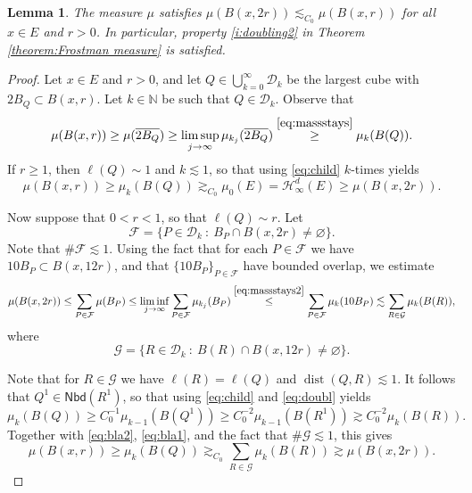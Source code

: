 \documentclass[11pt,reqno]{amsart}
\def\dF{{\mathcal{F}}}
\def\dG{{\mathcal{G}}}
\def\dist{\mathop\mathrm{dist}} 						%
\newtheorem{lemma}[theorem]{Lemma}
\theoremstyle{definition}
\theoremstyle{remark}
\numberwithin{equation}{section}
\newcommand{\N}{\mathbb{N}}
\newcommand{\hdc}{\mathcal{H}^d_\infty}
\newcommand{\DD}{\mathcal{D}}
\newcommand{\Nei}{\mathsf{Nbd}}
\theoremstyle{theorem}
\theoremstyle{definition}
\theoremstyle{remark}
\numberwithin{equation}{section}
\begin{document}
\begin{lemma}\label{l:doubling}
	The measure $\mu$ satisfies $\mu(B(x,2r)) \lesssim_{C_0} \mu(B(x,r))$ for all $x \in E$ and $r>0$. In particular, property \eqref{i:doubling2} in Theorem \ref{theorem:Frostman measure} is satisfied.
\end{lemma}
\begin{proof}
	Let $x\in E$ and $r>0$, and let $Q\in\bigcup_{k=0}^\infty\DD_k$ be the largest cube with $2B_Q\subset B(x,r)$. Let $k\in\N$ be such that $Q\in\DD_k$. Observe that
	\begin{equation}\label{eq:bla2}
		\mu(B(x,r))\ge\mu(\overline{2B_Q})\ge\limsup_{j \to \infty}\mu_{k_j}(\overline{2B_Q})\overset{\eqref{eq:massstays}}{\ge}\mu_k(B(Q)).
	\end{equation}
	If $r\ge 1$, then $\ell(Q)\sim 1$ and $k\lesssim 1$, so that using \eqref{eq:child} $k$-times yields
	\begin{equation*}
		\mu(B(x,r))\ge \mu_k(B(Q))	\gtrsim_{C_0} \mu_0(E)=\hdc(E) \ge \mu(B(x,2r)).
	\end{equation*}

	Now suppose that $0<r<1$, so that $\ell(Q)\sim r$. Let
	\begin{equation*}
		\mathcal{F} = \{P\in\DD_k\ :\ B_P\cap B(x,2r)\neq\varnothing\}.
	\end{equation*}
	Note that $\#\dF\lesssim 1$. Using the fact that for each $P\in\dF$ we have $10B_P\subset B(x,12r)$, and that $\{10B_P\}_{P\in\dF}$ have bounded overlap, we estimate
	\begin{equation}\label{eq:bla1}
		\mu(B(x,2r))\le \sum_{P\in\dF}\mu(B_P) \le \liminf_{j \to \infty} \sum_{P\in\dF} \mu_{k_j}(B_P) \overset{\eqref{eq:massstays2}}{\le} \sum_{P\in\dF} \mu_k(10 B_P)\lesssim \sum_{R\in\dG} \mu_k(B(R)),
	\end{equation}
	where
	\begin{equation*}
		\dG = \{R\in\DD_k\ :\ B(R)\cap B(x,12r)\neq\varnothing\}.
	\end{equation*}
	
	Note that for $R\in\dG$ we have $\ell(R)=\ell(Q)$ and $\dist(Q,R)\lesssim 1$. It follows that $Q^1\in\Nei(R^1)$, so that using \eqref{eq:child} and \eqref{eq:doubl} yields
	\begin{equation*}
		\mu_k(B(Q))\ge C_0^{-1}\mu_{k-1}(B(Q^1))\ge C_0^{-2}\mu_{k-1}(B(R^1))\gtrsim C_0^{-2}\mu_{k}(B(R)).
	\end{equation*}
	Together with \eqref{eq:bla2}, \eqref{eq:bla1}, and the fact that $\#\dG\lesssim 1$, this gives
	\begin{equation*}
	\mu(B(x,r))\ge \mu_k(B(Q)) \gtrsim_{C_0} \sum_{R\in\dG} \mu_k(B(R))\gtrsim \mu(B(x,2r)).
	\end{equation*}
\end{proof}
\end{document}
